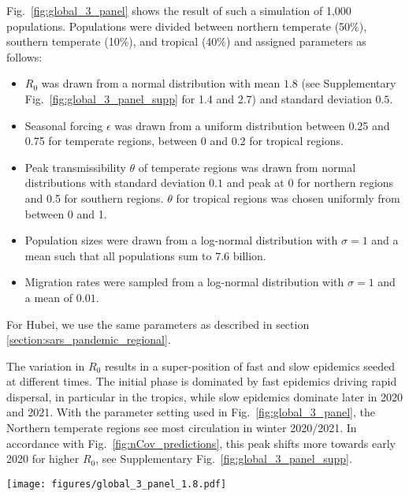 \documentclass[rmp, reprint, superscriptaddress, floatfix,amsmath]{revtex4-1}
\begin{document}
Fig.~\ref{fig:global_3_panel} shows the result of such a simulation of 1,000 populations.
Populations were divided between northern temperate (50\%), southern temperate (10\%), and tropical (40\%) and assigned parameters as follows:
\begin{itemize}
    \item $R_0$ was drawn from a normal distribution with mean $1.8$ (see Supplementary Fig.~\ref{fig:global_3_panel_supp} for 1.4 and 2.7) and standard deviation $0.5$.
    \item Seasonal forcing $\epsilon$ was drawn from a uniform distribution between 0.25 and 0.75 for temperate regions, between 0 and 0.2 for tropical regions.
    \item Peak transmissibility $\theta$ of temperate regions was drawn from normal distributions with standard deviation $0.1$ and peak at $0$ for northern regions and 0.5 for southern regions. $\theta$ for tropical regions was chosen uniformly from between 0 and 1. %
    \item Population sizes were drawn from a log-normal distribution with $\sigma=1$ and a mean such that all populations sum to $7.6$ billion.
    \item Migration rates were sampled from a log-normal distribution with $\sigma=1$ and a mean of $0.01$.
\end{itemize}
For Hubei, we use the same parameters as described in section \ref{section:sars_pandemic_regional}.%

The variation in $R_0$ results in a super-position of fast and slow epidemics seeded at different times.
The initial phase is dominated by fast epidemics driving rapid dispersal, in particular in the tropics, while slow epidemics dominate later in 2020 and 2021.
With the parameter setting used in Fig.~\ref{fig:global_3_panel}, the Northern temperate regions see most circulation in winter 2020/2021. 
In accordance with Fig.~\ref{fig:nCov_predictions}, this peak shifts more towards early 2020 for higher $R_0$, see Supplementary Fig.~\ref{fig:global_3_panel_supp}.

\begin{figure*}[tb]
    \centering
    \texttt{[image: figures/global\_3\_panel\_1.8.pdf]}
    \caption{{\bf Extended circulation through overlapping epidemics in variable subpopulations.} These simulations of a pandemic scenario assume 1,000 sub-populations with an average $\langle R_0\rangle$ of 1.8 and standard deviation $0.5$, 40\% of which have weak seasonal forcing $\epsilon \in [0,0.2]$ (tropical) and the remainder have strong variation with $\epsilon \in [0.25,0.75]$. The super-position of many variable epidemics can result in a global prevalence that decays only slowly through 2020 and 2021. 
    Lighter lines have lower $R_0$, darker lines have higher $R_0$. 
    The actual observed case counts reported for Hubei are added (brown line) and multiplied by three to account for possible under-reporting of mild cases. A subset of 30 randomly chosen simulations are plotted for each region.
    Analogous figures for different $R_0$ parameter values are shown in Supplementary Fig.~\ref{fig:global_3_panel_supp}.}
    \label{fig:global_3_panel}
\end{figure*}
\end{document}
